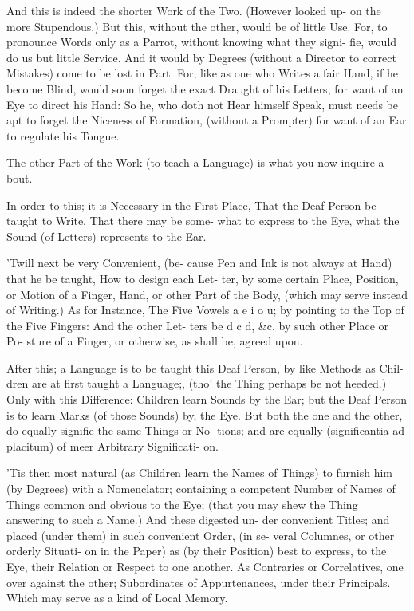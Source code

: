 And this is indeed the shorter Work
of the Two. (However looked up-
on the more Stupendous.) But this,
without the other, would be of little
Use. For, to pronounce Words only as a
Parrot, without knowing what they signi-
fie, would do us but little Service. And
it would by Degrees (without a Director
to correct Mistakes) come to be lost in
Part. For, like as one who Writes a fair
Hand, if he become Blind, would soon
forget the exact Draught of his Letters,
for want of an Eye to direct his Hand:
So he, who doth not Hear himself Speak,
must needs be apt to forget the Niceness of
Formation, (without a Prompter) for
want of an Ear to regulate his Tongue.

The other Part of the Work (to teach
a Language) is what you now inquire a-
bout.

In order to this; it is Necessary in the
First Place, That the Deaf Person be
taught to Write. That there may be some-
what to express to the Eye, what the
Sound (of Letters) represents to the Ear.

'Twill next be very Convenient, (be-
cause Pen and Ink is not always at Hand)
that he be taught, How to design each Let-
ter, by some certain Place, Position, or
Motion of a Finger, Hand, or other Part
of the Body, (which may serve instead
of Writing.) As for Instance, The Five
Vowels a e i o u; by pointing to the Top
of the Five Fingers: And the other Let-
ters be d c d, &c. by such other Place or Po-
sture of a Finger, or otherwise, as shall be,
agreed upon.

After this; a Language is to be taught
this Deaf Person, by like Methods as Chil-
dren are at first taught a Language;, (tho'
the Thing perhaps be not heeded.) Only
with this Difference: Children learn
Sounds by the Ear; but the Deaf Person
is to learn Marks (of those Sounds) by,
the Eye. But both the one and the other,
do equally signifie the same Things or No-
tions; and are equally (significantia ad
placitum) of meer Arbitrary Significati-
on.

'Tis then most natural (as Children
learn the Names of Things) to furnish
him (by Degrees) with a Nomenclator;
containing a competent Number of Names
of Things common and obvious to the Eye;
(that you may shew the Thing answering
to such a Name.) And these digested un-
der convenient Titles; and placed (under
them) in such convenient Order, (in se-
veral Columnes, or other orderly Situati-
on in the Paper) as (by their Position)
best to express, to the Eye, their Relation
or Respect to one another. As Contraries
or Correlatives, one over against the other;
Subordinates of Appurtenances, under their
Principals. Which may serve as a kind of
Local Memory.

